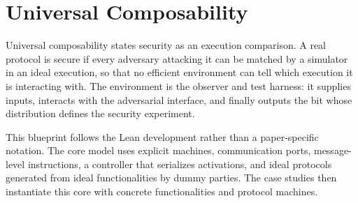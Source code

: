 \section{Universal Composability}

Universal composability states security as an execution comparison.  A real
protocol is secure if every adversary attacking it can be matched by a
simulator in an ideal execution, so that no efficient environment can tell
which execution it is interacting with.  The environment is the observer and
test harness: it supplies inputs, interacts with the adversarial interface, and
finally outputs the bit whose distribution defines the security experiment.

This blueprint follows the Lean development rather than a paper-specific
notation.  The core model uses explicit machines, communication ports,
message-level instructions, a controller that serializes activations, and
ideal protocols generated from ideal functionalities by dummy parties.  The
case studies then instantiate this core with concrete functionalities and
protocol machines.
